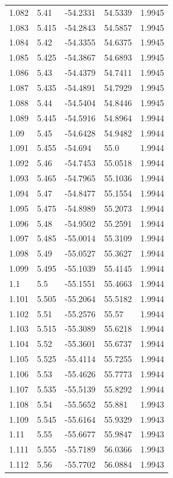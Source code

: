 \begin{tabular}{lllll}
1.082 & 5.41 & -54.2331 & 54.5339 & 1.9945 \\
1.083 & 5.415 & -54.2843 & 54.5857 & 1.9945 \\
1.084 & 5.42 & -54.3355 & 54.6375 & 1.9945 \\
1.085 & 5.425 & -54.3867 & 54.6893 & 1.9945 \\
1.086 & 5.43 & -54.4379 & 54.7411 & 1.9945 \\
1.087 & 5.435 & -54.4891 & 54.7929 & 1.9945 \\
1.088 & 5.44 & -54.5404 & 54.8446 & 1.9945 \\
1.089 & 5.445 & -54.5916 & 54.8964 & 1.9944 \\
1.09 & 5.45 & -54.6428 & 54.9482 & 1.9944 \\
1.091 & 5.455 & -54.694 & 55.0 & 1.9944 \\
1.092 & 5.46 & -54.7453 & 55.0518 & 1.9944 \\
1.093 & 5.465 & -54.7965 & 55.1036 & 1.9944 \\
1.094 & 5.47 & -54.8477 & 55.1554 & 1.9944 \\
1.095 & 5.475 & -54.8989 & 55.2073 & 1.9944 \\
1.096 & 5.48 & -54.9502 & 55.2591 & 1.9944 \\
1.097 & 5.485 & -55.0014 & 55.3109 & 1.9944 \\
1.098 & 5.49 & -55.0527 & 55.3627 & 1.9944 \\
1.099 & 5.495 & -55.1039 & 55.4145 & 1.9944 \\
1.1 & 5.5 & -55.1551 & 55.4663 & 1.9944 \\
1.101 & 5.505 & -55.2064 & 55.5182 & 1.9944 \\
1.102 & 5.51 & -55.2576 & 55.57 & 1.9944 \\
1.103 & 5.515 & -55.3089 & 55.6218 & 1.9944 \\
1.104 & 5.52 & -55.3601 & 55.6737 & 1.9944 \\
1.105 & 5.525 & -55.4114 & 55.7255 & 1.9944 \\
1.106 & 5.53 & -55.4626 & 55.7773 & 1.9944 \\
1.107 & 5.535 & -55.5139 & 55.8292 & 1.9944 \\
1.108 & 5.54 & -55.5652 & 55.881 & 1.9943 \\
1.109 & 5.545 & -55.6164 & 55.9329 & 1.9943 \\
1.11 & 5.55 & -55.6677 & 55.9847 & 1.9943 \\
1.111 & 5.555 & -55.7189 & 56.0366 & 1.9943 \\
1.112 & 5.56 & -55.7702 & 56.0884 & 1.9943 \\

\end{tabular}
